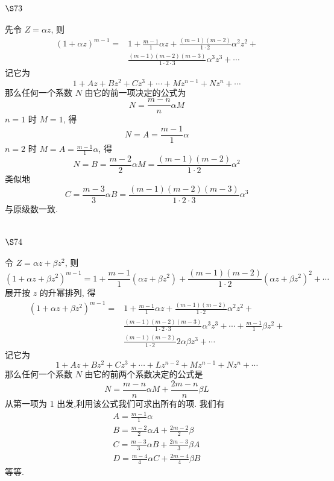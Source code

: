 \section{$\S 73$}

先令 $Z=\alpha z$, 则
\[
\begin{aligned}
(1+\alpha z)^{m-1}= & 1+\frac{m-1}{1} \alpha z+\frac{(m-1)(m-2)}{1 \cdot 2} \alpha^{2} z^{2}+ \\
& \frac{(m-1)(m-2)(m-3)}{1 \cdot 2 \cdot 3} \alpha^{3} z^{3}+\cdots
\end{aligned}
\]
记它为
\[
1+A z+B z^{2}+C z^{3}+\cdots+M z^{n-1}+N z^{n}+\cdots
\]
那么任何一个系数 $N$ 由它的前一项决定的公式为
\[
N=\frac{m-n}{n} \alpha M
\]
$n=1$ 时 $M=1$, 得 
\[
N=A=\frac{m-1}{1} \alpha
\]
$n=2$ 时 $M=A=\frac{m-1}{1} \alpha$, 得
\[
N=B=\frac{m-2}{2} \alpha M=\frac{(m-1)(m-2)}{1 \cdot 2} \alpha^{2}
\]
类似地
\[
C=\frac{m-3}{3} \alpha B=\frac{(m-1)(m-2)(m-3)}{1 \cdot 2 \cdot 3} \alpha^{3}
\]
与原级数一致.

\section{$\S 74$}

令 $Z=\alpha z+\beta z^{2}$, 则
\[
\left(1+\alpha z+\beta z^{2}\right)^{m-1}=1+\frac{m-1}{1}\left(\alpha z+\beta z^{2}\right)+\frac{(m-1)(m-2)}{1 \cdot 2}\left(\alpha z+\beta z^{2}\right)^{2}+\cdots
\]
展开按 $z$ 的升幂排列, 得
\[
\begin{aligned}
\left(1+\alpha z+\beta z^{2}\right)^{m-1}= & 1+\frac{m-1}{1} \alpha z+\frac{(m-1)(m-2)}{1 \cdot 2} \alpha^{2} z^{2}+ \\
& \frac{(m-1)(m-2)(m-3)}{1 \cdot 2 \cdot 3} \alpha^{3} z^{3}+\cdots+\frac{m-1}{1} \beta z^{2}+ \\
& \frac{(m-1)(m-2)}{1 \cdot 2} 2 \alpha \beta z^{3}+\cdots
\end{aligned}
\]
记它为
\[
1+A z+B z^{2}+C z^{3}+\cdots+L z^{n-2}+M z^{n-1}+N z^{n}+\cdots
\]
那么任何一个系数 $N$ 由它的前两个系数决定的公式是
\[
N=\frac{m-n}{n} \alpha M+\frac{2 m-n}{n} \beta L
\]
从第一项为 1 出发,利用该公式我们可求出所有的项. 我们有
\[
\begin{gathered}
A=\frac{m-1}{1} \alpha \\
B=\frac{m-2}{2} \alpha A+\frac{2 m-2}{2} \beta \\
C=\frac{m-3}{3} \alpha B+\frac{2 m-3}{3} \beta A \\
D=\frac{m-4}{4} \alpha C+\frac{2 m-4}{4} \beta B
\end{gathered}
\]
等等. 

